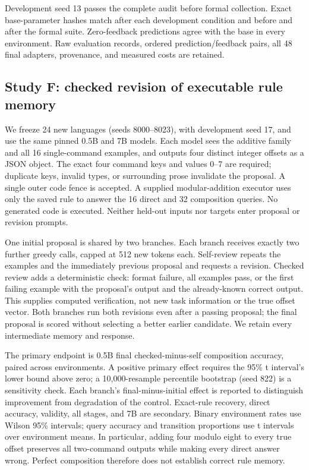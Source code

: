 \documentclass[11pt]{article}
\begin{document}
Development seed 13 passes the complete audit before formal collection.
Exact base-parameter hashes match after each development condition and before
and after the formal suite. Zero-feedback predictions agree with the base
in every environment. Raw evaluation records, ordered prediction/feedback
pairs, all 48 final adapters, provenance, and measured costs are retained.

\subsection{Study F: checked revision of executable rule memory}
We freeze 24 new languages (seeds 8000--8023), with development seed 17,
and use the same pinned 0.5B and 7B models. Each model sees the additive
family and all 16 single-command examples, and outputs four distinct integer
offsets as a JSON object. The exact four command keys and values 0--7 are
required; duplicate keys, invalid types, or surrounding prose invalidate the
proposal. A single outer code fence is accepted. A supplied modular-addition
executor uses only the saved rule to answer the 16 direct and 32 composition
queries. No generated code is executed. Neither held-out inputs nor targets
enter proposal or revision prompts.

One initial proposal is shared by two branches. Each branch receives exactly
two further greedy calls, capped at 512 new tokens each. Self-review repeats
the examples and the immediately previous proposal and requests a revision.
Checked review adds a deterministic check: format failure, all examples pass,
or the first failing example with the proposal's output and the already-known
correct output. This supplies computed verification, not new task information
or the true offset vector. Both branches run both revisions even after a
passing proposal; the final proposal is scored without selecting a better
earlier candidate. We retain every intermediate memory and response.

The primary endpoint is 0.5B final checked-minus-self composition accuracy,
paired across environments. A positive primary effect requires the 95\% t
interval's lower bound above zero; a 10,000-resample percentile bootstrap
(seed 822) is a sensitivity check. Each branch's final-minus-initial effect
is reported to distinguish improvement from degradation of the control.
Exact-rule recovery, direct accuracy, validity, all stages, and 7B are
secondary. Binary environment rates use Wilson 95\% intervals; query accuracy
and transition proportions use t intervals over environment means. In
particular, adding four modulo eight to every true offset
preserves all two-command outputs while making every direct answer wrong.
Perfect composition therefore does not establish correct rule memory.
\end{document}
